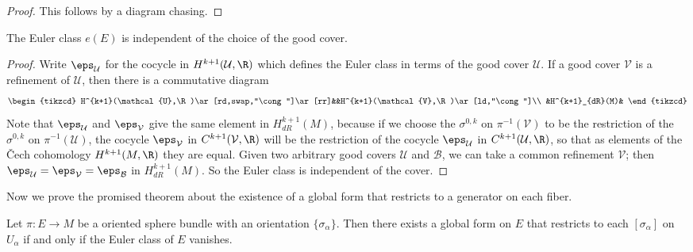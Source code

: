 \begin{proof}
This follows by a diagram chasing.
\end{proof}
\begin{proposition}
The Euler class $e(E)$ is independent of the choice of the good cover.
\end{proposition}
\begin{proof}
Write $\eps_\mathcal{U}$ for the cocycle in $H^{k+1}(\mathcal{U},\R)$ which defines the Euler class in terms of the good cover $\mathcal{U}$. If a good cover $\mathcal{V}$ 
is a refinement of $\mathcal{U}$, then there is a commutative diagram
\[\begin{tikzcd}
H^{k+1}(\mathcal{U},\R)\ar[rd,swap,"\cong"]\ar[rr]&&H^{k+1}(\mathcal{V},\R)\ar[ld,"\cong"]\\
&H^{k+1}_{dR}(M)&
\end{tikzcd}\]
Note that $\eps_{\mathcal{U}}$ and $\eps_{\mathcal{V}}$ give the same element in $H^{k+1}_{dR}(M)$, because if we choose the $\sigma^{0,k}$ on $\pi^{-1}(\mathcal{V})$ 
to be the restriction of the $\sigma^{0,k}$ on $\pi^{-1}(\mathcal{U})$, the cocycle $\eps_{\mathcal{V}}$ in $C^{k+1}(\mathcal{V},\R)$ will be the restriction of the 
cocycle $\eps_{\mathcal{U}}$ in $C^{k+1}(\mathcal{U},\R)$, so that as elements of the \v{C}ech cohomology $H^{k+1}(M,\R)$ they are equal. Given two arbitrary good 
covers $\mathcal{U}$ and $\mathcal{B}$, we can take a common refinement $\mathcal{V}$; then $\eps_{\mathcal{U}}=\eps_{\mathcal{V}}=\eps_{\mathcal{B}}$ in $H^{k+1}_{dR}(M)$. 
So the Euler class is independent of the cover.
\end{proof}
Now we prove the promised theorem about the existence of a global form that restricts to a generator on each fiber.
\begin{proposition}\label{sphere bundle global generator iff Euler class vanish}
Let $\pi:E\to M$ be a oriented sphere bundle with an orientation $\{\sigma_\alpha\}$. Then there exists a global form on $E$ that restricts to each $[\sigma_\alpha]$ 
on $U_\alpha$ if and only if the Euler class of $E$ vanishes.
\end{proposition}
